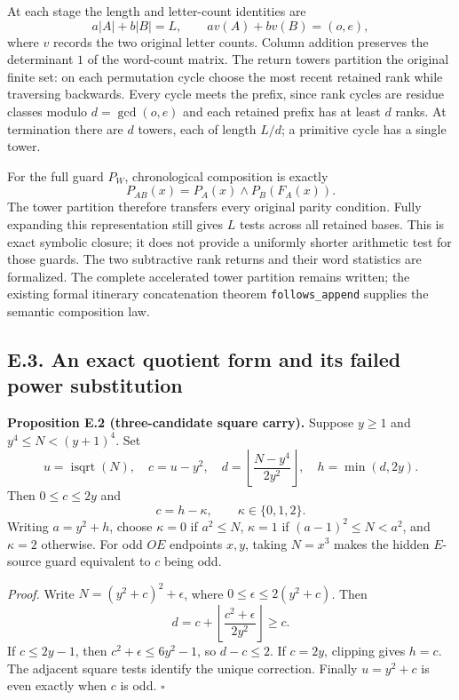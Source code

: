 \documentclass[12pt]{article}
\begin{document}
At each stage the length and letter-count identities are \[
a|A|+b|B|=L,\qquad av(A)+bv(B)=(o,e),
\] where \(v\) records the two original letter counts. Column addition
preserves the determinant \(1\) of the word-count matrix. The return
towers partition the original finite set: on each permutation cycle
choose the most recent retained rank while traversing backwards. Every
cycle meets the prefix, since rank cycles are residue classes modulo
\(d=\gcd(o,e)\) and each retained prefix has at least \(d\) ranks. At
termination there are \(d\) towers, each of length \(L/d\); a primitive
cycle has a single tower.

For the full guard \(P_W\), chronological composition is exactly \[
P_{AB}(x)=P_A(x)\wedge P_B(F_A(x)).
\] The tower partition therefore transfers every original parity
condition. Fully expanding this representation still gives \(L\) tests
across all retained bases. This is exact symbolic closure; it does not
provide a uniformly shorter arithmetic test for those guards. The two
subtractive rank returns and their word statistics are formalized. The
complete accelerated tower partition remains written; the existing
formal itinerary concatenation theorem
\texttt{\nolinkurl{follows_append}} supplies the semantic composition
law.

\subsection{E.3. An exact quotient form and its failed power
substitution}\label{e.3.-an-exact-quotient-form-and-its-failed-power-substitution}

\textbf{Proposition E.2 (three-candidate square carry).} Suppose
\(y\ge1\) and \(y^4\le N<(y+1)^4\). Set \[
u=\operatorname{isqrt}(N),\quad c=u-y^2,\quad
d=\left\lfloor\frac{N-y^4}{2y^2}\right\rfloor,\quad h=\min(d,2y).
\] Then \(0\le c\le2y\) and \[
c=h-\kappa,\qquad \kappa\in\{0,1,2\}.
\] Writing \(a=y^2+h\), choose \(\kappa=0\) if \(a^2\le N\),
\(\kappa=1\) if \((a-1)^2\le N<a^2\), and \(\kappa=2\) otherwise. For
odd \(OE\) endpoints \(x,y\), taking \(N=x^3\) makes the hidden
\(E\)-source guard equivalent to \(c\) being odd.

\emph{Proof.} Write \(N=(y^2+c)^2+\epsilon\), where
\(0\le\epsilon\le2(y^2+c)\). Then \[
d=c+\left\lfloor\frac{c^2+\epsilon}{2y^2}\right\rfloor\ge c.
\] If \(c\le2y-1\), then \(c^2+\epsilon\le6y^2-1\), so \(d-c\le2\). If
\(c=2y\), clipping gives \(h=c\). The adjacent square tests identify the
unique correction. Finally \(u=y^2+c\) is even exactly when \(c\) is
odd. \(\square\)
\end{document}
